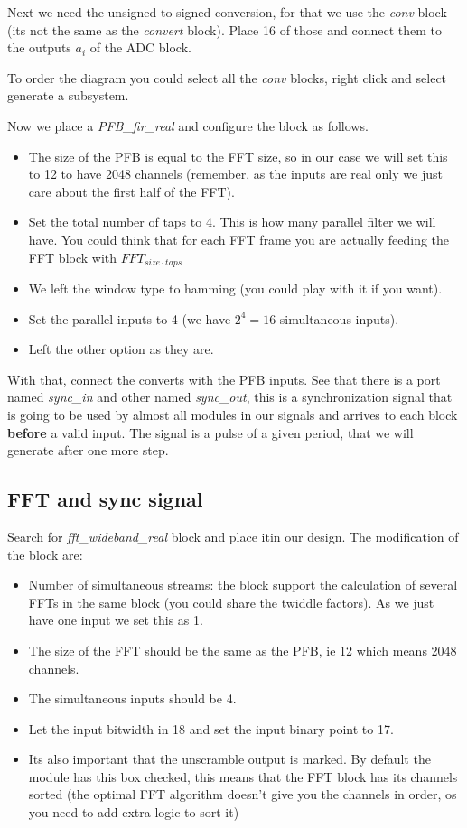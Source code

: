 Next we need the unsigned to signed conversion, for that we use the \textit{conv} block (its not the same as the \textit{convert} block). Place 16 of those and connect them to the outputs $a_{i}$ of the ADC block. 

To order the diagram you could select all the \textit{conv} blocks, right click and select generate a subsystem.

Now we place a \textit{PFB\_fir\_real} and configure the block as follows.
\begin{itemize}
    \item The size of the PFB is equal to the FFT size, so in our case we will set this to 12 to have 2048 channels (remember, as the inputs are real only we just care about the first half of the FFT).
    \item Set the total number of taps to 4. This is how many parallel filter we will have. You could think that for each FFT frame you are actually feeding the FFT block with $FFT_{size\cdot taps}$
    \item We left the window type to hamming (you could play with it if you want).
    \item Set the parallel inputs to 4 (we have $2^4=16$ simultaneous inputs).
    \item Left the other option as they are.
\end{itemize}

With that, connect the converts with the PFB inputs. See that there is a port named \textit{sync\_in} and other named \textit{sync\_out}, this is a synchronization signal that is going to be used by almost all modules in our signals and arrives to each block \textbf{before} a valid input. The signal is a pulse of a given period, that we will generate after one more step.


\subsection{FFT and sync signal}

Search for \textit{fft\_wideband\_real} block and place itin our design. The modification of the block are:
\begin{itemize}
    \item Number of simultaneous streams: the block support the calculation of several FFTs in the same block (you could share the twiddle factors). As we just have one input we set this as 1.
    \item The size of the FFT should be the same as the PFB, ie 12 which means 2048 channels.
    \item The simultaneous inputs should be 4.
    \item Let the input bitwidth in 18 and set the input binary point to 17.
    \item Its also important that the unscramble output is marked. By default the module has this box checked, this means that the FFT block has its channels sorted (the optimal FFT algorithm doesn't give you the channels in order, os you need to add extra logic to sort it)
\end{itemize}

